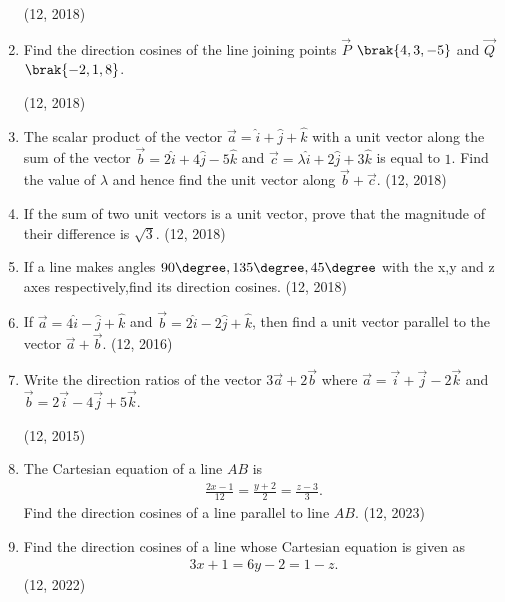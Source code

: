 \begin{enumerate}[label=\thesubsection.\arabic*,  ref=\thesubsection.\theenumi]
	\hfill (12, 2018)
\item Find the direction cosines of the line joining points $\vec{P}$ $\brak{4,3,-5}$ and $\vec{Q}$ $\brak{-2,1,8}$.

\hfill (12, 2018)
\item The scalar product of the vector $\overrightarrow{a} = \hat{i} + \hat{j} + \hat{k}$ with a unit vector along the sum of the vector $\overrightarrow{b} = 2\hat{i} + 4\hat{j} - 5\hat{k}$ and $\overrightarrow{c} = \lambda \hat{i} + 2\hat{j} + 3\hat{k}$ is equal to $1$. Find the value of $\lambda$ and hence find the unit vector along $\overrightarrow{b} + \overrightarrow{c}$.
\hfill (12, 2018) 
\item If the sum of two unit vectors is a unit vector, prove that the magnitude of their difference is $\sqrt{3}$.
\hfill (12, 2018) 
\item If a line makes angles $ 90\degree,135\degree,45\degree$ with the x,y and z axes respectively,find its direction cosines.
\hfill (12, 2018) 
\item If $\overrightarrow{a} = 4\hat{i} - \hat{j} +\hat{k}$ and $\overrightarrow{b} = 2\hat{i} - 2\hat{j} + \hat{k}$, then find a unit vector parallel to the vector $\overrightarrow{a}+\overrightarrow{b}$. \hfill (12, 2016)
\item Write the direction ratios of the vector $3\vec{a}+2\vec{b}$ where $\vec{a} = \vec{i}+\vec{j}-2\vec{k}$ and $\vec{b} = 2\vec{i}-4\vec{j}+5\vec{k}$.

	\hfill (12, 2015)
    \item The Cartesian equation of a line $AB$ is
    \begin{align}
        \frac{2x - 1}{12} = \frac{y + 2}{2} = \frac{z - 3}{3}.
    \end{align}
Find the direction cosines of a line parallel to line $AB$.
    \hfill (12, 2023)
    \item Find the direction cosines of a line whose Cartesian equation is given as
    \begin{align}
        3x + 1 = 6y - 2 = 1 - z.
    \end{align}
    \hfill (12, 2022)
\end{enumerate}
